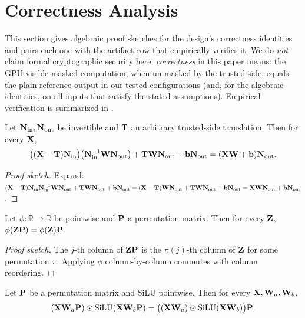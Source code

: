 \section{Correctness Analysis}
\label{sec:correctness}

This section gives algebraic proof sketches for the design's correctness identities and pairs each one with the artifact row that empirically verifies it. We do \emph{not} claim formal cryptographic security here; \emph{correctness} in this paper means: the GPU-visible masked computation, when un-masked by the trusted side, equals the plain reference output in our tested configurations (and, for the algebraic identities, on all inputs that satisfy the stated assumptions). Empirical verification is summarized in .

\begin{theorem}
\label{thm:linear}
Let $\mathbf{N}_{\mathrm{in}}, \mathbf{N}_{\mathrm{out}}$ be invertible and $\mathbf{T}$ an arbitrary trusted-side translation. Then for every $\mathbf{X}$,
\[
\big((\mathbf{X} - \mathbf{T})\mathbf{N}_{\mathrm{in}}\big)\big(\mathbf{N}_{\mathrm{in}}^{-1}\mathbf{W}\mathbf{N}_{\mathrm{out}}\big) + \mathbf{T}\mathbf{W}\mathbf{N}_{\mathrm{out}} + \mathbf{b}\mathbf{N}_{\mathrm{out}} = (\mathbf{X}\mathbf{W} + \mathbf{b})\mathbf{N}_{\mathrm{out}}.
\]
\end{theorem}

\begin{proof}[Proof sketch]
Expand: $(\mathbf{X} - \mathbf{T})\mathbf{N}_{\mathrm{in}}\mathbf{N}_{\mathrm{in}}^{-1}\mathbf{W}\mathbf{N}_{\mathrm{out}} + \mathbf{T}\mathbf{W}\mathbf{N}_{\mathrm{out}} + \mathbf{b}\mathbf{N}_{\mathrm{out}} = (\mathbf{X} - \mathbf{T})\mathbf{W}\mathbf{N}_{\mathrm{out}} + \mathbf{T}\mathbf{W}\mathbf{N}_{\mathrm{out}} + \mathbf{b}\mathbf{N}_{\mathrm{out}} = \mathbf{X}\mathbf{W}\mathbf{N}_{\mathrm{out}} + \mathbf{b}\mathbf{N}_{\mathrm{out}}$.
\end{proof}

\begin{theorem}
\label{thm:pointwise}
Let $\phi: \mathbb{R} \to \mathbb{R}$ be pointwise and $\mathbf{P}$ a permutation matrix. Then for every $\mathbf{Z}$, $\phi(\mathbf{Z}\mathbf{P}) = \phi(\mathbf{Z})\mathbf{P}$.
\end{theorem}

\begin{proof}[Proof sketch]
The $j$-th column of $\mathbf{Z}\mathbf{P}$ is the $\pi(j)$-th column of $\mathbf{Z}$ for some permutation $\pi$. Applying $\phi$ column-by-column commutes with column reordering.
\end{proof}

\begin{theorem}
\label{thm:swiglu}
Let $\mathbf{P}$ be a permutation matrix and SiLU pointwise. Then for every $\mathbf{X}, \mathbf{W}_a, \mathbf{W}_b$,
\[
(\mathbf{X}\mathbf{W}_a\mathbf{P})\odot\mathrm{SiLU}(\mathbf{X}\mathbf{W}_b\mathbf{P}) = \big((\mathbf{X}\mathbf{W}_a)\odot\mathrm{SiLU}(\mathbf{X}\mathbf{W}_b)\big)\mathbf{P}.
\]
\end{theorem}

